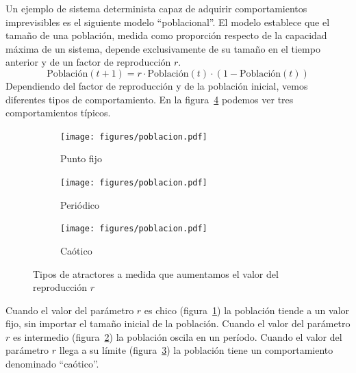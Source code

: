\documentclass[a4paper,10pt]{book}
\theoremstyle{definition}
\begin{document}
Un ejemplo de sistema determinista capaz de adquirir comportamientos imprevisibles es el siguiente modelo ``poblacional''.
El modelo establece que el tamaño de una población, medida como proporción respecto de la capacidad máxima de un sistema, depende exclusivamente de su tamaño en el tiempo anterior y de un factor de reproducción $r$.
\begin{equation}
 \text{Población}(t+1) = r \cdot \text{Población}(t)\cdot (1-\text{Población}(t))
\end{equation}
Dependiendo del factor de reproducción y de la población inicial, vemos diferentes tipos de comportamiento.
En la figura~\ref{fig:poblacion} podemos ver tres comportamientos típicos.
\begin{figure}[ht!]
    \centering
    \begin{subfigure}[b]{0.32\textwidth}
    \texttt{[image: figures/poblacion.pdf]}
    \caption{Punto fijo}
    \label{fig:poblacion_punto_fijo}
    \end{subfigure}
    \begin{subfigure}[b]{0.32\textwidth}
    \texttt{[image: figures/poblacion.pdf]}
    \caption{Periódico}
    \label{fig:poblacion_periodico}
    \end{subfigure}
    \begin{subfigure}[b]{0.32\textwidth}
    \texttt{[image: figures/poblacion.pdf]}
    \caption{Caótico}
    \label{fig:poblacion_caotico}
    \end{subfigure}
    \caption{
    Tipos de atractores a medida que aumentamos el valor del reproducción $r$
    }
    \label{fig:poblacion}
\end{figure}
Cuando el valor del parámetro $r$ es chico (figura~\ref{fig:poblacion_punto_fijo}) la población tiende a un valor fijo, sin importar el tamaño inicial de la población.
Cuando el valor del parámetro $r$ es intermedio (figura~\ref{fig:poblacion_periodico}) la población oscila en un período.
Cuando el valor del parámetro $r$ llega a su límite (figura~\ref{fig:poblacion_caotico}) la población tiene un comportamiento denominado ``caótico''.

\end{document}
